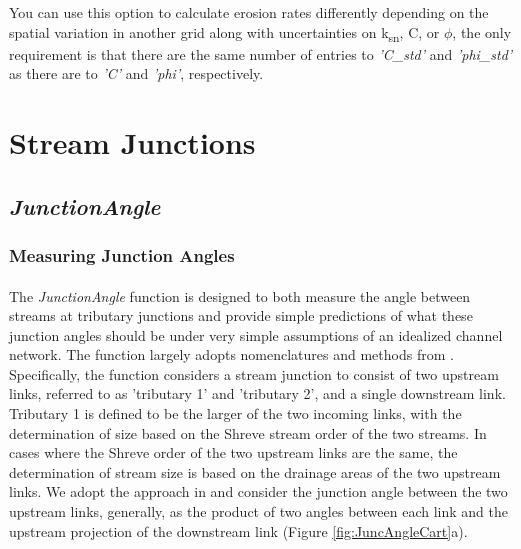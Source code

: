 \noindent You can use this option to calculate erosion rates differently depending on the spatial variation in another grid along with uncertainties on k\textsubscript{sn}, C, or $\phi$, the only requirement is that there are the same number of entries to \textit{'C\_std'} and \textit{'phi\_std'} as there are to \textit{'C'} and \textit{'phi'}, respectively.

\section{Stream Junctions}
\subsection{\textit{JunctionAngle}} \label{sec:JAngle}
\subsubsection{Measuring Junction Angles}
\paragraph{}The \textit{JunctionAngle} function is designed to both measure the angle between streams at tributary junctions and provide simple predictions of what these junction angles should be under very simple assumptions of an idealized channel network. The function largely adopts nomenclatures and methods from \cite{Howard1971}. Specifically, the function considers a stream junction to consist of two upstream links, referred to as 'tributary 1' and 'tributary 2', and a single downstream link. Tributary 1 is defined to be the larger of the two incoming links, with the determination of size based on the Shreve stream order of the two streams. In cases where the Shreve order of the two upstream links are the same, the determination of stream size is based on the drainage areas of the two upstream links. We adopt the approach in \cite{Howard1971} and consider the junction angle between the two upstream links, generally, as the product of two angles between each link and the upstream projection of the downstream link (Figure \ref{fig:JuncAngleCart}a).

